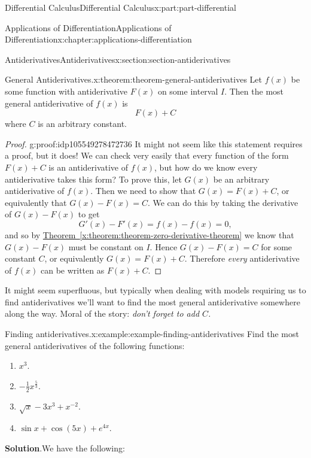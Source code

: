 \documentclass[twoside,10pt,]{book}
\newcommand{\blocktitlefont}{\relax}
\newcommand{\xreffont}{\relax}
\numberwithin{equation}{part}
\begin{document}
\begin{partptx}{Differential Calculus}{}{Differential Calculus}{}{}{x:part:part-differential}
\begin{chapterptx}{Applications of Differentiation}{}{Applications of Differentiation}{}{}{x:chapter:applications-differentiation}
\begin{sectionptx}{Antiderivatives}{}{Antiderivatives}{}{}{x:section:section-antiderivatives}
\begin{theorem}{General Antiderivatives.}{}{x:theorem:theorem-general-antiderivatives}%
Let \(f(x)\) be some function with antiderivative \(F(x)\) on some interval \(I\). Then the most general antiderivative of \(f(x)\) is%
\begin{equation*}
F(x) + C
\end{equation*}
where \(C\) is an arbitrary constant.%
\end{theorem}
\begin{proof}{}{g:proof:idp105549278472736}
It might not seem like this statement requires a proof, but it does! We can check very easily that every function of the form \(F(x)+C\) is an antiderivative of \(f(x)\), but how do we know every antiderivative takes this form? To prove this, let \(G(x)\) be an arbitrary antiderivative of \(f(x)\). Then we need to show that \(G(x) = F(x) + C\), or equivalently that \(G(x) - F(x) = C\). We can do this by taking the derivative of \(G(x) - F(x)\) to get%
\begin{equation*}
G'(x) - F'(x) = f(x) - f(x) = 0,
\end{equation*}
and so by \hyperref[x:theorem:theorem-zero-derivative-theorem]{Theorem~{\xreffont\ref{x:theorem:theorem-zero-derivative-theorem}}} we know that \(G(x) - F(x)\) must be constant on \(I\). Hence \(G(x) - F(x) = C\) for some constant \(C\), or equivalently \(G(x) = F(x)+C\). Therefore \emph{every} antiderivative of \(f(x)\) can be written as \(F(x) + C\).%
\end{proof}
It might seem superfluous, but typically when dealing with models requiring us to find antiderivatives we'll want to find the most general antiderivative somewhere along the way. Moral of the story: \emph{don't forget to add \(C\).}%
\begin{example}{Finding antiderivatives.}{x:example:example-finding-antiderivatives}%
Find the most general antiderivatives of the following functions:%
\begin{enumerate}
\item{}\(\displaystyle x^{3}.\)%
\item{}\(\displaystyle -\frac{1}{2}x^{\frac{5}{3}}.\)%
\item{}\(\displaystyle \sqrt{x} - 3x^{3} + x^{-2}.\)%
\item{}\(\displaystyle \sin x + \cos (5x) + e^{4x}.\)%
\end{enumerate}
%
\par\smallskip%
\noindent\textbf{\blocktitlefont Solution}.\hypertarget{g:solution:idp105549278483488}{}\quad{}We have the following:%

\end{example}
\end{sectionptx}
\end{chapterptx}
\end{partptx}
\end{document}
